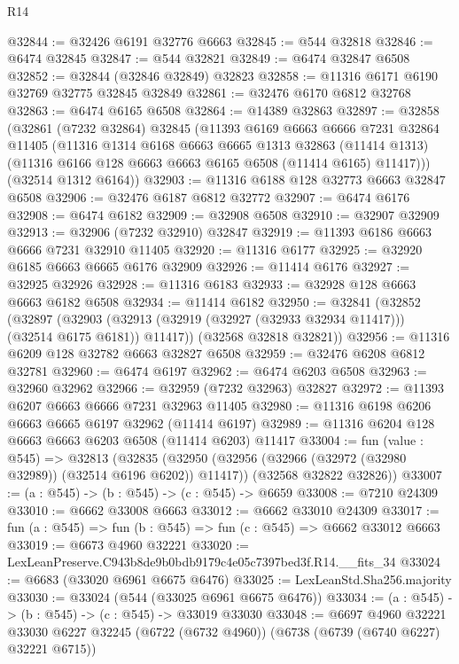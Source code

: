 \begin{lexlean}{R14}
\begin{coremodule}
@32844 := @32426 @6191 @32776 @6663
@32845 := @544 @32818
@32846 := @6474 @32845
@32847 := @544 @32821
@32849 := @6474 @32847 @6508
@32852 := @32844 (@32846 @32849) @32823
@32858 := @11316 @6171 @6190 @32769 @32775 @32845 @32849
@32861 := @32476 @6170 @6812 @32768
@32863 := @6474 @6165 @6508
@32864 := @14389 @32863
@32897 := @32858
    (@32861
      (@7232 @32864)
      @32845
      (@11393
        @6169
        @6663
        @6666
        @7231
        @32864
        @11405
        (@11316
          @1314
          @6168
          @6663
          @6665
          @1313
          @32863
          (@11414 @1313)
          (@11316 @6166 @128 @6663 @6663 @6165 @6508 (@11414 @6165) @11417)))
      (@32514 @1312 @6164))
@32903 := @11316 @6188 @128 @32773 @6663 @32847 @6508
@32906 := @32476 @6187 @6812 @32772
@32907 := @6474 @6176
@32908 := @6474 @6182
@32909 := @32908 @6508
@32910 := @32907 @32909
@32913 := @32906 (@7232 @32910) @32847
@32919 := @11393 @6186 @6663 @6666 @7231 @32910 @11405
@32920 := @11316 @6177
@32925 := @32920 @6185 @6663 @6665 @6176 @32909
@32926 := @11414 @6176
@32927 := @32925 @32926
@32928 := @11316 @6183
@32933 := @32928 @128 @6663 @6663 @6182 @6508
@32934 := @11414 @6182
@32950 := @32841
    (@32852
      (@32897
        (@32903 (@32913 (@32919 (@32927 (@32933 @32934 @11417))) (@32514 @6175 @6181)) @11417))
      (@32568 @32818 @32821))
@32956 := @11316 @6209 @128 @32782 @6663 @32827 @6508
@32959 := @32476 @6208 @6812 @32781
@32960 := @6474 @6197
@32962 := @6474 @6203 @6508
@32963 := @32960 @32962
@32966 := @32959 (@7232 @32963) @32827
@32972 := @11393 @6207 @6663 @6666 @7231 @32963 @11405
@32980 := @11316 @6198 @6206 @6663 @6665 @6197 @32962 (@11414 @6197)
@32989 := @11316 @6204 @128 @6663 @6663 @6203 @6508 (@11414 @6203) @11417
@33004 := fun (value : @545) =>
  @32813
    (@32835
      (@32950 (@32956 (@32966 (@32972 (@32980 @32989)) (@32514 @6196 @6202)) @11417))
      (@32568 @32822 @32826))
@33007 := (a : @545) -> (b : @545) -> (c : @545) -> @6659
@33008 := @7210 @24309
@33010 := @6662 @33008 @6663
@33012 := @6662 @33010 @24309
@33017 := fun (a : @545) => fun (b : @545) => fun (c : @545) => @6662 @33012 @6663
@33019 := @6673 @4960 @32221
@33020 := LexLeanPreserve.C943b8de9b0bdb9179c4e05c7397bed3f.R14.__fits_34
@33024 := @6683 (@33020 @6961 @6675 @6476)
@33025 := LexLeanStd.Sha256.majority
@33030 := @33024 (@544 (@33025 @6961 @6675 @6476))
@33034 := (a : @545) -> (b : @545) -> (c : @545) -> @33019 @33030
@33048 := @6697
    @4960
    @32221
    @33030
    @6227
    @32245
    (@6722 (@6732 @4960))
    (@6738 (@6739 (@6740 @6227) @32221 @6715))

\end{coremodule}
\end{lexlean}
